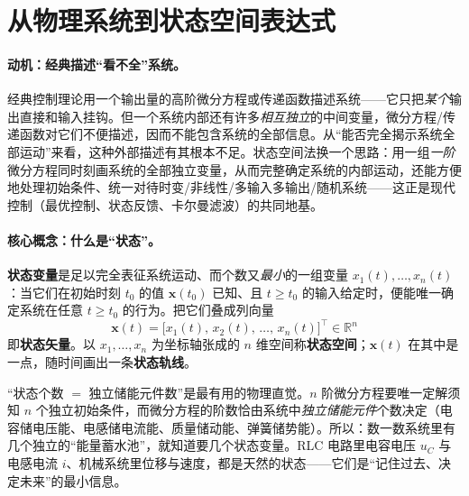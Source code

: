 \section{从物理系统到状态空间表达式}
\label{sec:ssb-state}

\paragraph{动机：经典描述“看不全”系统。}
经典控制理论用一个输出量的高阶微分方程或传递函数描述系统——它只把\emph{某个}输出直接和输入挂钩\cite{liubao2006modern}。但一个系统内部还有许多\emph{相互独立}的中间变量，微分方程/传递函数对它们不便描述，因而不能包含系统的全部信息。从“能否完全揭示系统全部运动”来看，这种外部描述有其根本不足。状态空间法换一个思路：用一组\emph{一阶}微分方程同时刻画系统的全部独立变量，从而完整确定系统的内部运动，还能方便地处理初始条件、统一对待时变/非线性/多输入多输出/随机系统——这正是现代控制（最优控制、状态反馈、卡尔曼滤波）的共同地基。

\paragraph{核心概念：什么是“状态”。}
\begin{definition}[状态变量与状态矢量]\label{def:ssb-state}
\textbf{状态变量}是足以完全表征系统运动、而个数又\emph{最小}的一组变量 $x_1(t),\dots,x_n(t)$：当它们在初始时刻 $t_0$ 的值 $\mathbf{x}(t_0)$ 已知、且 $t\ge t_0$ 的输入给定时，便能唯一确定系统在任意 $t\ge t_0$ 的行为。把它们叠成列向量
\begin{equation}
  \mathbf{x}(t)=\big[x_1(t),\,x_2(t),\,\dots,\,x_n(t)\big]^\top\in\mathbb{R}^n
  \label{eq:ssb-statevec}
\end{equation}
即\textbf{状态矢量}。以 $x_1,\dots,x_n$ 为坐标轴张成的 $n$ 维空间称\textbf{状态空间}；$\mathbf{x}(t)$ 在其中是一点，随时间画出一条\textbf{状态轨线}。
\end{definition}

\begin{insight}
“状态个数 $=$ 独立储能元件数”是最有用的物理直觉\cite{liubao2006modern}。$n$ 阶微分方程要唯一定解须知 $n$ 个独立初始条件，而微分方程的阶数恰由系统中\emph{独立储能元件}个数决定（电容储电压能、电感储电流能、质量储动能、弹簧储势能）。所以：数一数系统里有几个独立的“能量蓄水池”，就知道要几个状态变量。RLC 电路里电容电压 $u_C$ 与电感电流 $i$、机械系统里位移与速度，都是天然的状态——它们是“记住过去、决定未来”的最小信息。
\end{insight}

